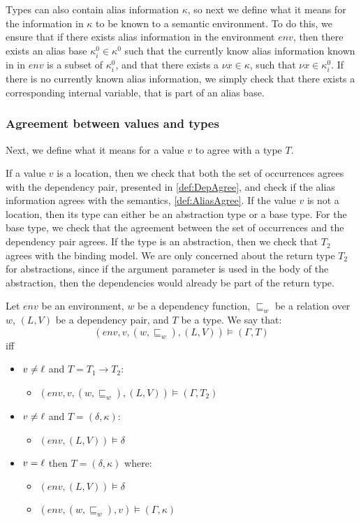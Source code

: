 \documentclass[acmsmall,sigplan]{acmart}
\begin{document}
Types can also contain alias information $\kappa$, so next we define
what it means for the information in $\kappa$ to be known to a semantic environment.
To do this, we ensure that if there exists alias information in the
environment $env$, then there exists an alias base
$\kappa^0_i\in\kappa^0$ such that the currently know alias information
known in in $env$ is a subset of $\kappa^0_i$, and that there exists a
$\nu x\in\kappa$, such that $\nu x\in \kappa^0_i$. 
If there is no currently known alias information, we simply check that
there exists a corresponding internal variable, that is part of an
alias base.

\subsubsection{Agreement between values and types}

Next, we define what it means for a value $v$ to agree with a type $T$.
 
If a value $v$ is a location, then we check that both the set of occurrences agrees with the dependency pair, presented in \cref{def:DepAgree}, 
and check if the alias information agrees with the semantics, \cref{def:AliasAgree}.
If the value $v$ is not a location, then its type can either be an
abstraction type or a base type.
For the base type, we check that the agreement between the set of occurrences and the dependency pair agrees.
If the type is an abstraction, then we check that $T_2$ agrees with 
the binding model. 
We are only concerned about the return type $T_2$ for abstractions,
since if the argument parameter is used in the body of the
abstraction, then the dependencies would already be part of the return
type. 

\begin{definition}\label{def:TAgree}
	Let $env$ be an environment, $w$ be a dependency function, $\sqsubseteq_w$ be a relation over $w$, $(L,V)$ be a dependency pair, and $T$ be a type.
	We say that:
	$$(env,v,(w,\sqsubseteq_w),(L,V))\models(\Gamma,T)$$
	iff
	\begin{itemize}
		\item $v\neq\ell$ and $T=T_1\rightarrow T_2$:
		\begin{itemize}
			\item $(env,v,(w,\sqsubseteq_w),(L,V))\models(\Gamma,T_2)$
		\end{itemize}

		\item $v\neq\ell$ and $T=(\delta,\kappa)$:
		\begin{itemize}
			\item $(env,(L,V))\models\delta$
		\end{itemize}

		\item $v=\ell$ then $T=(\delta,\kappa)$ where:
		\begin{itemize}
			\item $(env,(L,V))\models\delta$
			\item $(env,(w,\sqsubseteq_w),v)\models(\Gamma,\kappa)$
		\end{itemize}
	\end{itemize}
\end{definition}
\end{document}
